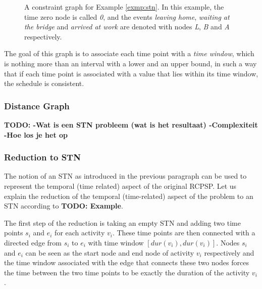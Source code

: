 \documentclass{article}
\theoremstyle{definition}
\newcommand{\TODO}[1]{{\color{red}\textbf{TODO: #1}}}
\newcommand{\dur}[1]{\ensuremath{dur(v_{#1})}} %
\begin{document}
\begin{figure}[h]
	\centering
	\caption{A constraint graph for Example \ref{exmp:stn}. In this example, the time zero node is called \emph{0}, and the events \emph{leaving home},  \emph{waiting at the bridge} and \emph{arrived at work} are denoted with nodes \emph{L}, \emph{B} and \emph{A} respectively.}
\end{figure}

The goal of this graph is to associate each time point with a \emph{time window}, which is nothing more than an interval with a lower and an upper bound, in such a way that if each time point is associated with a value that lies within its time window, the schedule is consistent.

\subsubsection{Distance Graph}

\TODO{
		-Wat is een STN probleem (wat is het resultaat)
		-Complexiteit
		-Hoe los je het op
}

\subsubsection{Reduction to STN}
The notion of an STN as introduced in the previous paragraph can be used to represent the temporal (time related) aspect of the original RCPSP. Let us explain the reduction of the temporal (time-related) aspect of the problem to an STN according to \TODO{Example}.

The first step of the reduction is taking an empty STN and adding two time points $s_i$ and $e_i$ for each activity $v_i$. 
These time points are then connected with a directed edge from $s_i$ to $e_i$ with time window $[\dur{i}, \dur{i}]$. 
Nodes $s_i$ and $e_i$ can be seen as the start node and end node of activity $v_i$ respectively and the time window associated with the edge that connects these two nodes forces the time between the two time points to be exactly the duration of the activity $v_i$.
\end{document}
